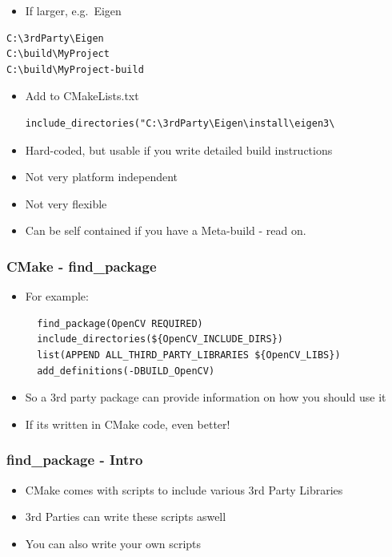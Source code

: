 \begin{itemize}
\itemsep1pt\parskip0pt
\item
  If larger, e.g.~Eigen
\end{itemize}

\begin{verbatim}
C:\3rdParty\Eigen
C:\build\MyProject
C:\build\MyProject-build
\end{verbatim}

\begin{itemize}
\item
  Add to CMakeLists.txt

\begin{verbatim}
include_directories("C:\3rdParty\Eigen\install\eigen3\
\end{verbatim}
\item
  Hard-coded, but usable if you write detailed build instructions
\item
  Not very platform independent
\item
  Not very flexible
\item
  Can be self contained if you have a Meta-build - read on.
\end{itemize}

\subsubsection{CMake - find\_package}\label{cmake---findux5fpackage}

\begin{itemize}
\item
  For example:

\begin{verbatim}
  find_package(OpenCV REQUIRED)
  include_directories(${OpenCV_INCLUDE_DIRS})
  list(APPEND ALL_THIRD_PARTY_LIBRARIES ${OpenCV_LIBS})
  add_definitions(-DBUILD_OpenCV)
\end{verbatim}
\item
  So a 3rd party package can provide information on how you should use
  it
\item
  If its written in CMake code, even better!
\end{itemize}

\subsubsection{find\_package - Intro}\label{findux5fpackage---intro}

\begin{itemize}
\itemsep1pt\parskip0pt
\item
  CMake comes with scripts to include various 3rd Party Libraries
\item
  3rd Parties can write these scripts aswell
\item
  You can also write your own scripts
\end{itemize}

